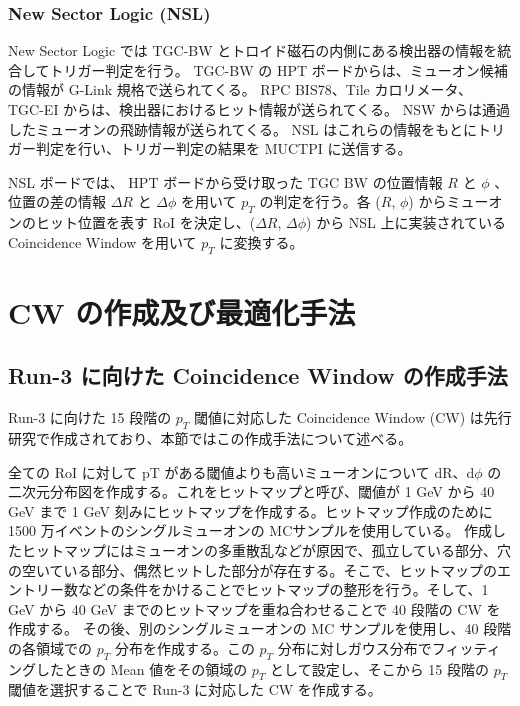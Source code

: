 \subsubsection{New Sector Logic (NSL)}
New Sector Logic では TGC-BW とトロイド磁石の内側にある検出器の情報を統合してトリガー判定を行う。
TGC-BW の HPT ボードからは、ミューオン候補の情報が G-Link 規格で送られてくる。
RPC BIS78、Tile カロリメータ、 TGC-EI からは、検出器におけるヒット情報が送られてくる。
NSW からは通過したミューオンの飛跡情報が送られてくる。
NSL はこれらの情報をもとにトリガー判定を行い、トリガー判定の結果を MUCTPI に送信する。

NSL ボードでは、 HPT ボードから受け取った TGC BW の位置情報 $R$ と $\phi$ 、位置の差の情報 $\Delta R$ と $\Delta \phi$ を用いて $p_T$ の判定を行う。各 ($R$, $\phi$) からミューオンのヒット位置を表す RoI を決定し、($\Delta R$, $\Delta \phi$) から NSL 上に実装されている Coincidence Window を用いて $p_T$ に変換する。




\section{CW の作成及び最適化手法}\label{section:最適化}
\subsection{Run-3 に向けた Coincidence Window の作成手法}
Run-3 に向けた 15 段階の $p_T$ 閾値に対応した Coincidence Window (CW) は先行研究で作成されており、本節ではこの作成手法について述べる。

全ての RoI に対して pT がある閾値よりも高いミューオンについて dR、d$\phi$ の二次元分布図を作成する。これをヒットマップと呼び、閾値が 1 GeV から 40 GeV まで 1 GeV 刻みにヒットマップを作成する。ヒットマップ作成のために 1500 万イベントのシングルミューオンの MCサンプルを使用している。
作成したヒットマップにはミューオンの多重散乱などが原因で、孤立している部分、穴の空いている部分、偶然ヒットした部分が存在する。そこで、ヒットマップのエントリー数などの条件をかけることでヒットマップの整形を行う。そして、1 GeV から 40 GeV までのヒットマップを重ね合わせることで 40 段階の CW を作成する。
その後、別のシングルミューオンの MC サンプルを使用し、40 段階の各領域での $p_T$ 分布を作成する。この $p_T$ 分布に対しガウス分布でフィッティングしたときの Mean 値をその領域の $p_T$ として設定し、そこから 15 段階の $p_T$ 閾値を選択することで Run-3 に対応した CW を作成する。



